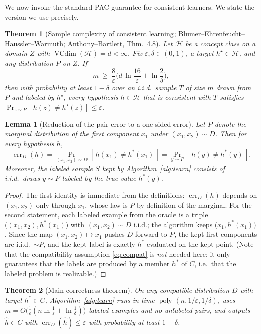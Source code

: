 \documentclass{amsart}
\newtheorem{theorem}{Theorem}
\newtheorem{lemma}{Lemma}
\theoremstyle{definition}
\theoremstyle{remark}
\newcommand{\eps}{\varepsilon}
\DeclareMathOperator{\VCdim}{VCdim}
\DeclareMathOperator*{\err}{err}
\DeclareMathOperator{\poly}{poly}
\begin{document}
We now invoke the standard PAC guarantee for consistent learners. We state the
version we use precisely.

\begin{theorem}[Sample complexity of consistent learning; Blumer--Ehrenfeucht--Haussler--Warmuth;
Anthony--Bartlett, Thm.~4.8]
\label{thm:pac}
Let $\mathcal H$ be a concept class on a domain $Z$ with $\VCdim(\mathcal
H)=d<\infty$. Fix $\eps,\delta\in(0,1)$, a target $h^\star\in\mathcal H$, and any
distribution $P$ on $Z$. If
\[
m\ \ge\ \frac{8}{\eps}\Big(d\,\ln\frac{16}{\eps}+\ln\frac{2}{\delta}\Big),
\]
then with probability at least $1-\delta$ over an i.i.d.\ sample $T$ of size $m$
drawn from $P$ and labeled by $h^\star$, every hypothesis $h\in\mathcal H$ that
is consistent with $T$ satisfies $\Pr_{z\sim P}[h(z)\neq h^\star(z)]\le\eps$.
\end{theorem}

\begin{lemma}[Reduction of the pair-error to a one-sided error]\label{lem:reduce}
Let $P$ denote the marginal distribution of the first component $x_1$ under
$(x_1,x_2)\sim D$. Then for every hypothesis $h$,
\[
\err_D(h)=\Pr_{(x_1,x_2)\sim D}[\,h(x_1)\neq h^*(x_1)\,]
=\Pr_{y\sim P}[\,h(y)\neq h^*(y)\,].
\]
Moreover, the labeled sample $S$ kept by Algorithm~\ref{alg:learn} consists of
i.i.d.\ draws $y\sim P$ labeled by the true value $h^*(y)$.
\end{lemma}

\begin{proof}
The first identity is immediate from the definitions: $\err_D(h)$ depends on
$(x_1,x_2)$ only through $x_1$, whose law is $P$ by definition of the marginal.
For the second statement, each labeled example from the oracle is a triple
$\big((x_1,x_2),h^*(x_1)\big)$ with $(x_1,x_2)\sim D$ i.i.d.; the algorithm
keeps $\big(x_1,h^*(x_1)\big)$. Since the map $(x_1,x_2)\mapsto x_1$ pushes $D$
forward to $P$, the kept first components are i.i.d.\ $\sim P$, and the kept
label is exactly $h^*$ evaluated on the kept point. (Note that the
compatibility assumption \eqref{eq:compat} is \emph{not} needed here; it only
guarantees that the labels are produced by a member $h^*$ of $C$, i.e.\ that the
labeled problem is realizable.)
\end{proof}

\begin{theorem}[Main correctness theorem]\label{thm:main}
On any compatible distribution $D$ with target $h^*\in C$, Algorithm~\ref{alg:learn}
runs in time $\poly(n,1/\eps,1/\delta)$, uses
$m=O\big(\tfrac1\eps(n\ln\tfrac1\eps+\ln\tfrac1\delta)\big)$ labeled examples and
no unlabeled pairs, and outputs $\hat h\in C$ with $\err_D(\hat h)\le\eps$ with
probability at least $1-\delta$.
\end{theorem}
\end{document}
